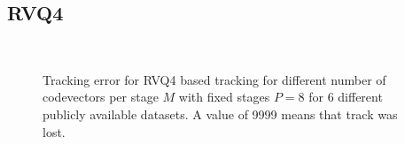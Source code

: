\subsection{RVQ4}
\begin{figure}[h!]
\centering
\\
\caption{Tracking error for RVQ4 based tracking for different number of codevectors per stage $M$ with fixed stages $P=8$ for 6 different publicly available datasets. A value of 9999 means that track was lost.}
\label{fig:trk_rvq4}
\end{figure}

